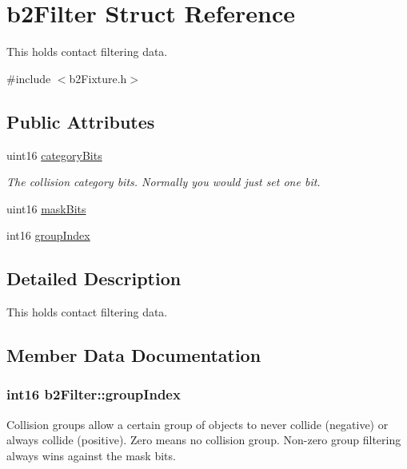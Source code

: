 \hypertarget{structb2_filter}{\section{b2\-Filter Struct Reference}
\label{structb2_filter}
}


This holds contact filtering data.  




{\ttfamily \#include $<$b2\-Fixture.\-h$>$}

\subsection*{Public Attributes}
\begin{DoxyCompactItemize}
\item 
\hypertarget{structb2_filter_a368907397168d39af8b4fc5201d50bba}{uint16 \hyperlink{structb2_filter_a368907397168d39af8b4fc5201d50bba}{category\-Bits}}\label{structb2_filter_a368907397168d39af8b4fc5201d50bba}

\begin{DoxyCompactList}\small\item\em The collision category bits. Normally you would just set one bit. \end{DoxyCompactList}\item 
uint16 \hyperlink{structb2_filter_a533cccf85e3ba3d9e3700d73b819f6e2}{mask\-Bits}
\item 
int16 \hyperlink{structb2_filter_a572a8f4a1672f6d5d71123a35e872950}{group\-Index}
\end{DoxyCompactItemize}


\subsection{Detailed Description}
This holds contact filtering data. 

\subsection{Member Data Documentation}
\hypertarget{structb2_filter_a572a8f4a1672f6d5d71123a35e872950}{
\subsubsection[{group\-Index}]{\setlength{\rightskip}{0pt plus 5cm}int16 {\bf b2\-Filter\-::group\-Index}}}\label{structb2_filter_a572a8f4a1672f6d5d71123a35e872950}
Collision groups allow a certain group of objects to never collide (negative) or always collide (positive). Zero means no collision group. Non-\/zero group filtering always wins against the mask bits. 


